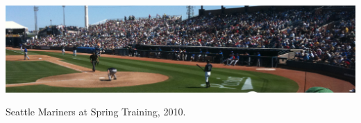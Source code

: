 \documentclass[sigconf]{acmart}
\begin{document}

\begin{abstract}
  A clear and well-documented \LaTeX\ document is presented as an
  article formatted for publication by ACM in a conference proceedings
  or journal publication. Based on the ``acmart'' document class, this
  article presents and explains many of the common variations, as well
  as many of the formatting elements an author may use in the
  preparation of the documentation of their work.
\end{abstract}





\begin{teaserfigure}
  \includegraphics[width=\textwidth]{sampleteaser}
  \caption{Seattle Mariners at Spring Training, 2010.}
  \label{fig:teaser}
\end{teaserfigure}

\maketitle
\end{document}
